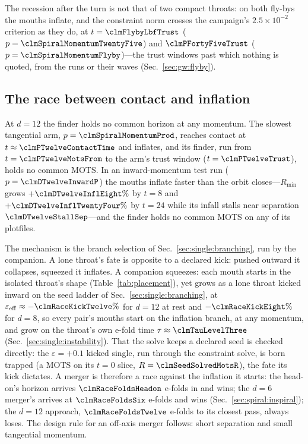 \documentclass[twocolumn,floatfix,aps,prd,superscriptaddress,nofootinbib]{revtex4-2}
\begin{document}
The recession after the turn is not that of two compact throats: on both fly-bys the mouths inflate, and the constraint norm crosses the campaign's $2.5\times10^{-2}$ criterion as they do, at $t=\clmFlybyLbfTrust$ ($p=\clmSpiralMomentumTwentyFive$) and $\clmPFortyFiveTrust$ ($p=\clmSpiralMomentumFlyby$)---the trust windows past which nothing is quoted, from the runs or their waves (Sec.~\ref{sec:gw:flyby}).

\subsection{The race between contact and inflation}
\label{sec:spiral:race}

At $d=12$ the finder holds no common horizon at any momentum. The slowest tangential arm, $p=\clmSpiralMomentumProd$, reaches contact at $t\approx\clmPTwelveContactTime$ and inflates, and its finder, run from $t=\clmPTwelveMotsFrom$ to the arm's trust window ($t=\clmPTwelveTrust$), holds no common MOTS. In an inward-momentum test run ($p=\clmDTwelveInwardP$) the mouths inflate faster than the orbit closes---$R_{\min}$ grows $+\clmDTwelveInflEight\%$ by $t=8$ and $+\clmDTwelveInflTwentyFour\%$ by $t=24$ while its infall stalls near separation $\clmDTwelveStallSep$---and the finder holds no common MOTS on any of its plotfiles.

The mechanism is the branch selection of Sec.~\ref{sec:single:branching}, run by the companion. A lone throat's fate is opposite to a declared kick: pushed outward it collapses, squeezed it inflates. A companion squeezes: each mouth starts in the isolated throat's shape (Table~\ref{tab:placement}), yet grows as a lone throat kicked inward on the seed ladder of Sec.~\ref{sec:single:branching}, at $\varepsilon_{\rm eff}\approx-\clmRaceKickTwelve\%$ for $d=12$ at rest and $-\clmRaceKickEight\%$ for $d=8$, so every pair's mouths start on the inflation branch, at any momentum, and grow on the throat's own e-fold time $\tau\approx\clmTauLevelThree$ (Sec.~\ref{sec:single:instability}). That the solve keeps a declared seed is checked directly: the $\varepsilon=+0.1$ kicked single, run through the constraint solve, is born trapped (a MOTS on its $t=0$ slice, $R=\clmSeedSolvedMotsR$), the fate its kick dictates. A merger is therefore a race against the inflation it starts: the head-on's horizon arrives $\clmRaceFoldsHeadon$ e-folds in and wins; the $d=6$ merger's arrives at $\clmRaceFoldsSix$ e-folds and wins (Sec.~\ref{sec:spiral:inspiral}); the $d=12$ approach, $\clmRaceFoldsTwelve$ e-folds to its closest pass, always loses. The design rule for an off-axis merger follows: short separation and small tangential momentum.
\end{document}
